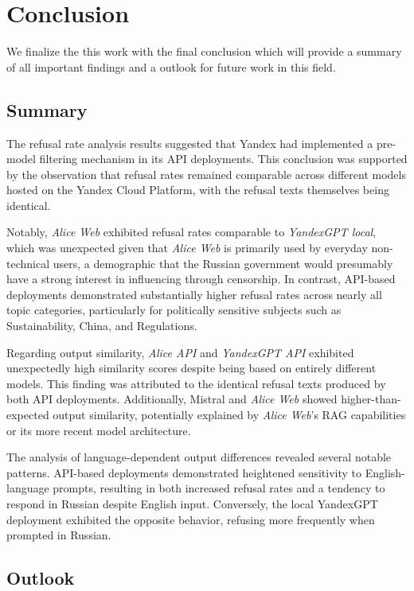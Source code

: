 \chapter{Conclusion}\label{chap:conclusion}

We finalize the this work with the final conclusion which will provide a summary of all important findings and a outlook for future work in this field.

\section{Summary}

The refusal rate analysis results suggested that Yandex had implemented a pre-model filtering mechanism in its API deployments. This conclusion was supported by the observation that refusal rates remained comparable across different models hosted on the Yandex Cloud Platform, with the refusal texts themselves being identical.

Notably, \textit{Alice Web} exhibited refusal rates comparable to \textit{YandexGPT local}, which was unexpected given that \textit{Alice Web} is primarily used by everyday non-technical users, a demographic that the Russian government would presumably have a strong interest in influencing through censorship. In contrast, API-based deployments demonstrated substantially higher refusal rates across nearly all topic categories, particularly for politically sensitive subjects such as Sustainability, China, and Regulations.

Regarding output similarity, \textit{Alice API} and \textit{YandexGPT API} exhibited unexpectedly high similarity scores despite being based on entirely different models. This finding was attributed to the identical refusal texts produced by both API deployments. Additionally, Mistral and \textit{Alice Web} showed higher-than-expected output similarity, potentially explained by \textit{Alice Web}'s RAG capabilities or its more recent model architecture.

The analysis of language-dependent output differences revealed several notable patterns. API-based deployments demonstrated heightened sensitivity to English-language prompts, resulting in both increased refusal rates and a tendency to respond in Russian despite English input. Conversely, the local YandexGPT deployment exhibited the opposite behavior, refusing more frequently when prompted in Russian.

\section{Outlook}


